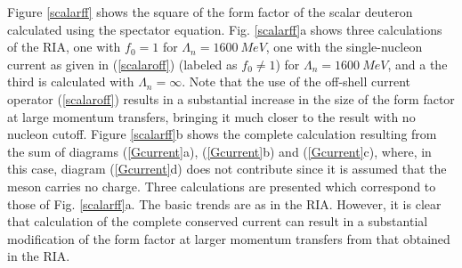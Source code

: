\documentclass[mythesis.tex]{subfiles}
\begin{document}
Figure \ref{scalarff} shows the square of the form factor of the scalar
deuteron calculated using the spectator equation. Fig. \ref{scalarff}a
shows three calculations of the RIA, one with $f_0=1$ for
$\Lambda_n=1600~MeV$, one with the single-nucleon current as given in
(\ref{scalaroff}) (labeled as $f_0\neq 1$) for $\Lambda_n=1600~MeV$, and
a the third is calculated with $\Lambda_n=\infty$. Note that the use of
the off-shell current operator (\ref{scalaroff}) results in a substantial
increase in the size of the form factor at large momentum transfers,
bringing it much closer to the result with no nucleon cutoff.
Figure \ref{scalarff}b shows the complete calculation resulting from the
sum of diagrams
(\ref{Gcurrent}a), (\ref{Gcurrent}b) and (\ref{Gcurrent}c), where, in this
case, diagram (\ref{Gcurrent}d) does not contribute since it is assumed
that the meson carries no charge. Three calculations are presented which
correspond to those of Fig. \ref{scalarff}a. The basic trends are as in the
RIA. However, it is clear that calculation of the complete
conserved current can result in a substantial modification of the form
factor at larger momentum transfers from that obtained in the RIA.
\end{document}
